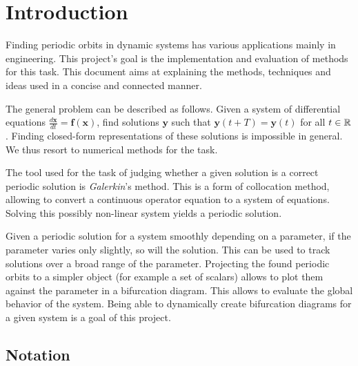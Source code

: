 \section{Introduction}


Finding periodic orbits in dynamic systems has various applications mainly in engineering. %
This project's goal is the implementation and evaluation of methods for this task.
This document aims at explaining the methods, techniques and ideas used in a concise and connected manner.

The general problem can be described as follows.
Given a system of differential equations $\frac{d \mathbf x}{dt} = \mathbf f(\mathbf x)$, find solutions $\mathbf y$ such that $\mathbf y(t+T) = \mathbf y(t)$ for all $t \in \mathbb{R}$.
Finding closed-form representations of these solutions is impossible in general.
We thus resort to numerical methods for the task.

The tool used for the task of judging whether a given solution is a correct periodic solution is \emph{Galerkin}'s method.
This is a form of collocation method, allowing to convert a continuous operator equation to a system of equations.
Solving this possibly non-linear system yields a periodic solution.

Given a periodic solution for a system smoothly depending on a parameter, if the parameter varies only slightly, so will the solution.
This can be used to track solutions over a broad range of the parameter.
Projecting the found periodic orbits to a simpler object (for example a set of scalars) allows to plot them against the parameter in a bifurcation diagram.
This allows to evaluate the global behavior of the system.
Being able to dynamically create bifurcation diagrams for a given system is a goal of this project.


\subsection{Notation}

